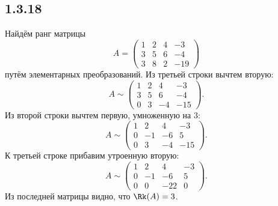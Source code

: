 \subsection{1.3.18}

Найдём ранг матрицы
\[
A=
\begin{pmatrix}
	1 & 2 & 4 & -3 \\
	3 & 5 & 6 & -4 \\
	3 & 8 & 2 & -19
\end{pmatrix}
\]
путём элементарных преобразований. Из третьей строки вычтем вторую:
\[
A\sim
\begin{pmatrix}
	1 & 2 & 4 & -3 \\
	3 & 5 & 6 & -4 \\
	0 & 3 & -4 & -15
\end{pmatrix}.
\]
Из второй строки вычтем первую, умноженную на $3$:
\[
A\sim
\begin{pmatrix}
	1 & 2 & 4 & -3 \\
	0 & -1 & -6 & 5 \\
	0 & 3 & -4 & -15
\end{pmatrix}.
\]
К третьей строке прибавим утроенную вторую:
\[
A\sim
\begin{pmatrix}
	1 & 2 & 4 & -3 \\
	0 & -1 & -6 & 5 \\
	0 & 0 & -22 & 0
\end{pmatrix}.
\]
Из последней матрицы видно, что $\Rk(A)=3$.
